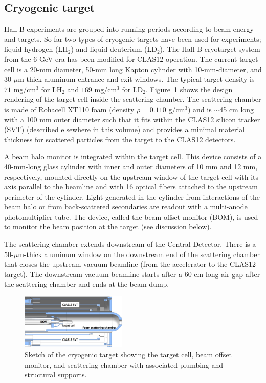 \subsection{Cryogenic target}
\label{sec-cryotgt}

Hall B experiments are grouped into running periods according to beam energy and targets. So far two types of cryogenic targets have been 
used for experiments; liquid hydrogen (LH$_2$) and liquid deuterium (LD$_2$). The Hall-B cryotarget system from the $6$ GeV era  
\cite{CLAS} has been modified for CLAS12 operation.  The current target cell is a 20-mm diameter, 50-mm long Kapton cylinder
with 10-mm-diameter, and 30-$\mu$m-thick aluminum entrance and exit windows. The typical target density is $71$ mg/cm$^3$ for LH$_2$ 
and $169$ mg/cm$^3$ for LD$_2$. Figure~\ref{fig:targsch} shows the design 
rendering of the target cell inside the scattering chamber.  The scattering chamber is made of Rohacell XT110 foam (density 
$\rho=0.110$ g/cm$^3$) and is $\sim$45 cm long with a 100 mm outer diameter such that it fits within the CLAS12 silicon tracker (SVT) 
(described elsewhere in this volume) and provides a minimal material thickness for scattered particles from the target to the CLAS12 detectors.  

A beam halo monitor is integrated within the target cell. This device consists of a 40-mm-long glass cylinder with inner and outer diameters 
of 10 mm and 12 mm, respectively, mounted directly on the upstream window of the target cell with its axis parallel to the beamline and 
with 16 optical fibers attached to the upstream perimeter of the cylinder. Light generated in the cylinder 
from interactions of the beam halo or from back-scattered secondaries are readout with a multi-anode photomultiplier tube. The device, called 
the  beam-offset monitor (BOM), is used to monitor the beam position at the target (see discussion below).  

The scattering chamber extends downstream of the Central Detector. There is a 50-$\mu$m-thick aluminum window on the downstream end 
of the scattering chamber that closes the upstream vacuum beamline (from the accelerator to the CLAS12 target). The downstream vacuum 
beamline starts after a 60-cm-long air gap after the scattering chamber and ends at the beam dump.  

\begin{figure}[t]
\begin{center}
\includegraphics[width=0.45\textwidth]{target_sch.pdf}
	\caption{Sketch of the cryogenic target showing the target cell, beam offset monitor, and scattering chamber with associated plumbing 
	and structural supports.}
\label{fig:targsch}
\end{center}
\end{figure}

